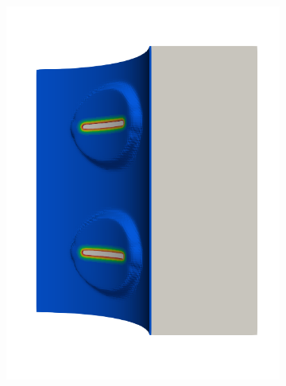 \begin{frame}
\begin{columns}[T]
\begin{column}{0.6\textwidth}
\begin{figure}
{\begin{subfigure}{0.19\textwidth}
            \includegraphics[width=\textwidth]{examples/figures/seed_d_5}
          \end{subfigure}
          \hspace{0.06\textwidth}
          \begin{subfigure}{0.19\textwidth}
            \centering

\end{subfigure}}
\end{figure}
\end{column}
\end{columns}
\end{frame}
